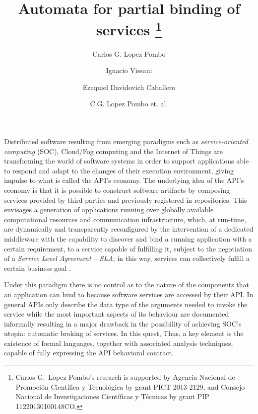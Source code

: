 

 \title{Automata for partial binding of services
	\thanks{Carlos G.\ Lopez Pombo's research is supported by Agencia Nacional de Promoción Científica y Tecnológica by grant PICT 2013-2129, and Consejo Nacional de Investigaciones Científicas y Técnicas by grant PIP 11220130100148CO.}
}

\author{Carlos G. Lopez Pombo  \and Ignacio Vissani  \and Ezequiel Davidovich Caballero }
\author{C.G. Lopez Pombo et. al.}


\maketitle

Distributed software resulting from emerging paradigms such as \emph{service-oriented computing} (SOC), Cloud/Fog computing and the Internet of Things are transforming the world of software systems in order to support applications able to respond and adapt to the changes of their execution environment, giving impulse to what is called the API's economy. The underlying idea of the API's economy is that it is possible to construct software artifacts by composing services provided by third parties and previously registered in repositories. This envisages a generation of applications running over globally available computational resources and communication infrastructure, which, at run-time, are dynamically and transparently reconfigured by the intervention of a dedicated middleware with the capability to discover and bind a running application with a certain requirement, to a service capable of fulfilling it, subject to the negotiation of a \emph{Service Level Agreement -- SLA}; in this way, services can collectively fulfill a certain business goal 
\cite{fiadeiro:fac_23-4}.

Under this paradigm there is no control as to the nature of the components that an application can bind to because 
software services are accessed by their API. In general APIs only describe the data type of the arguments needed to invoke the service while the most important aspects of its behaviour are documented informally resulting in a major drawback in the possibility of achieving SOC's utopia: automatic broking of services. In this quest, 
Thus, a key element is the existence of formal languages, together with associated analysis techniques, capable of fully expressing the API behavioral contract.

